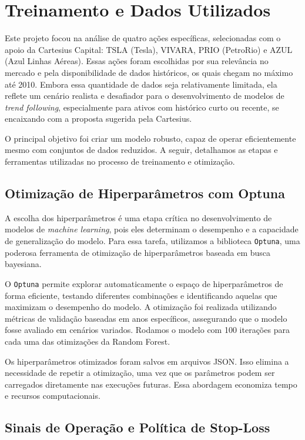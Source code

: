 \documentclass{article}
\begin{document}
\newpage

\section{Treinamento e Dados Utilizados}

Este projeto focou na análise de quatro ações específicas, selecionadas com o apoio da Cartesius Capital: TSLA (Tesla), VIVARA, PRIO (PetroRio) e AZUL (Azul Linhas Aéreas). Essas ações foram escolhidas por sua relevância no mercado e pela disponibilidade de dados históricos, os quais chegam no máximo até 2010. Embora essa quantidade de dados seja relativamente limitada, ela reflete um cenário realista e desafiador para o desenvolvimento de modelos de \textit{trend following}, especialmente para ativos com histórico curto ou recente, se encaixando com a proposta sugerida pela Cartesius.

O principal objetivo foi criar um modelo robusto, capaz de operar eficientemente mesmo com conjuntos de dados reduzidos. A seguir, detalhamos as etapas e ferramentas utilizadas no processo de treinamento e otimização.

\subsection{Otimização de Hiperparâmetros com Optuna}

A escolha dos hiperparâmetros é uma etapa crítica no desenvolvimento de modelos de \textit{machine learning}, pois eles determinam o desempenho e a capacidade de generalização do modelo. Para essa tarefa, utilizamos a biblioteca \texttt{Optuna}, uma poderosa ferramenta de otimização de hiperparâmetros baseada em busca bayesiana.

O \texttt{Optuna} permite explorar automaticamente o espaço de hiperparâmetros de forma eficiente, testando diferentes combinações e identificando aquelas que maximizam o desempenho do modelo. A otimização foi realizada utilizando métricas de validação baseadas em anos específicos, assegurando que o modelo fosse avaliado em cenários variados. Rodamos o modelo com 100 iterações para cada uma das otimizações da Random Forest.

Os hiperparâmetros otimizados foram salvos em arquivos JSON. Isso elimina a necessidade de repetir a otimização, uma vez que os parâmetros podem ser carregados diretamente nas execuções futuras. Essa abordagem economiza tempo e recursos computacionais.

\subsection{Sinais de Operação e Política de Stop-Loss}
\end{document}
